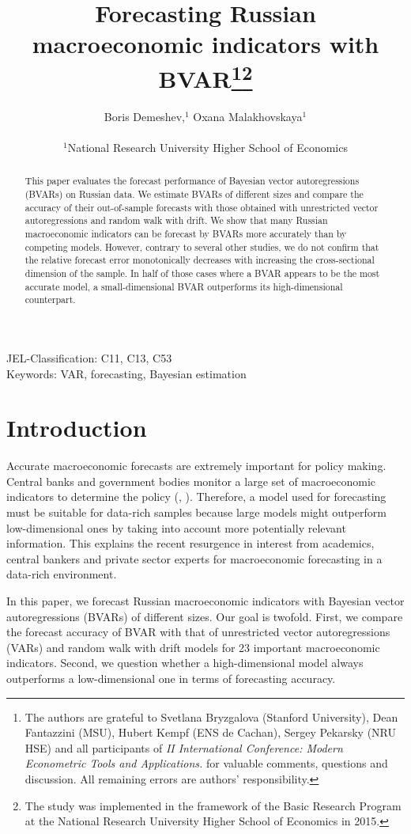 \documentclass[11pt]{article} %
\title{Forecasting Russian macroeconomic indicators with BVAR\footnote{The authors are grateful to Svetlana Bryzgalova (Stanford University), Dean Fantazzini (MSU),  Hubert Kempf (ENS de Cachan), Sergey Pekarsky (NRU HSE) and all participants of \textit{II International Conference: Modern Econometric Tools and Applications.} for valuable comments, questions and discussion. All remaining errors are authors’ responsibility.}\footnote{The study was implemented in the framework of the Basic Research Program at the National Research University Higher School of Economics in 2015.
}}
\author{Boris Demeshev,$^{1}$   Oxana Malakhovskaya$^{1}$\\
\\
\normalsize{$^{1}$National Research University Higher School of Economics}\\
}
\date{}
\begin{document}
\maketitle



\begin{abstract}
This paper evaluates the forecast performance of Bayesian vector autoregressions (BVARs) on Russian data. We estimate BVARs of different sizes and compare the accuracy of their out-of-sample forecasts with those obtained with unrestricted vector autoregressions and random walk with drift. We show that many Russian macroeconomic indicators can be forecast by BVARs more accurately than by competing models. However, contrary to several other studies, we do not confirm that the relative forecast error monotonically decreases with increasing the cross-sectional dimension of the sample. In half of those cases where a BVAR appears to be the most accurate model, a small-dimensional BVAR outperforms its high-dimensional counterpart.
\end{abstract}

\smallskip
\noindent JEL-Classification: C11, C13, C53\\
\smallskip
\noindent Keywords: VAR, forecasting, Bayesian estimation

\section{Introduction}

Accurate macroeconomic forecasts are extremely important for policy making. Central banks and government bodies monitor a large set of macroeconomic indicators to determine the policy (\cite{beckner_1996}, \cite{bernanke_boivin_2003}). Therefore, a model used for forecasting must be suitable for data-rich samples because large models might outperform low-dimensional ones by taking into account more potentially relevant information. This explains the recent resurgence in interest from academics, central bankers and private sector experts for macroeconomic forecasting in a data-rich environment.

In this paper, we forecast Russian macroeconomic indicators with Bayesian vector autoregressions (BVARs) of different sizes. Our goal is twofold.  First, we compare the forecast accuracy of BVAR with that of unrestricted vector autoregressions (VARs) and random walk with drift models for 23 important macroeconomic indicators. Second, we  question whether a high-dimensional model always outperforms a low-dimensional one in terms of forecasting accuracy.
\end{document}
